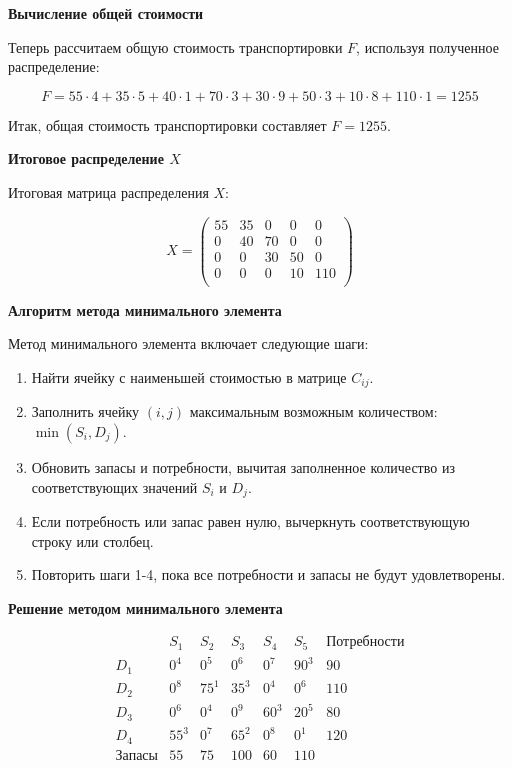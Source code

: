 \documentclass{article}
\begin{document}
\textbf{Вычисление общей стоимости}

Теперь рассчитаем общую стоимость транспортировки \(F\), используя полученное распределение:

\[
    F = 55 \cdot 4 + 35 \cdot 5 + 40 \cdot 1 + 70 \cdot 3 + 30 \cdot 9 + 50 \cdot 3 + 10 \cdot 8 + 110 \cdot 1 = 1255
\]

Итак, общая стоимость транспортировки составляет \(F = 1255\).

\textbf{Итоговое распределение \(X\)}

Итоговая матрица распределения \(X\):

\[
    X = \begin{pmatrix}
        55 & 35 & 0  & 0  & 0   \\
        0  & 40 & 70 & 0  & 0   \\
        0  & 0  & 30 & 50 & 0   \\
        0  & 0  & 0  & 10 & 110 \\
    \end{pmatrix}
\]

\textbf{Алгоритм метода минимального элемента}

Метод минимального элемента включает следующие шаги:

\begin{enumerate}
    \item Найти ячейку с наименьшей стоимостью в матрице \(C_{ij}\).

    \item Заполнить ячейку \((i, j)\) максимальным возможным количеством: \(\min(S_i, D_j)\).

    \item Обновить запасы и потребности, вычитая заполненное количество из соответствующих значений \(S_i\) и \(D_j\).

    \item Если потребность или запас равен нулю, вычеркнуть соответствующую строку или столбец.

    \item Повторить шаги 1-4, пока все потребности и запасы не будут удовлетворены.
\end{enumerate}

\textbf{Решение методом минимального элемента}

\[
    \begin{array}{c|ccccc|c}
                      & S_1  & S_2  & S_3  & S_4  & S_5  & \text{Потребности} \\
        \hline
        D_1           & 0^4  & 0^5  & 0^6  & 0^7  & 90^3 & 90                 \\
        D_2           & 0^8  & 75^1 & 35^3 & 0^4  & 0^6  & 110                \\
        D_3           & 0^6  & 0^4  & 0^9  & 60^3 & 20^5 & 80                 \\
        D_4           & 55^3 & 0^7  & 65^2 & 0^8  & 0^1  & 120                \\
        \hline
        \text{Запасы} & 55   & 75   & 100  & 60   & 110  &                    \\
    \end{array}
\]
\end{document}
